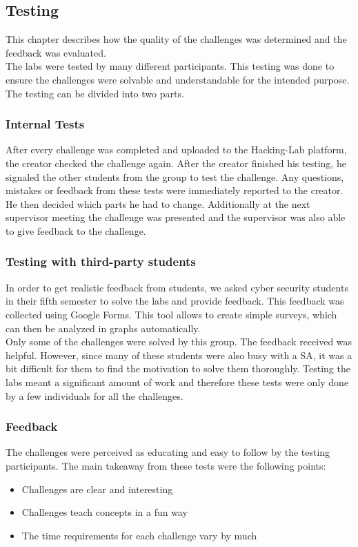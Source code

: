 \subsection{Testing}
This chapter describes how the quality of the challenges was determined and the feedback was evaluated. \\
The labs were tested by many different participants. This testing was done to ensure the challenges were solvable and understandable for the intended purpose. The testing can be divided into two parts.

\subsubsection{Internal Tests}
After every challenge was completed and uploaded to the Hacking-Lab platform, the creator checked the challenge again. After the creator finished his testing, he signaled the other students from the group to test the challenge. Any questions, mistakes or feedback from these tests were immediately reported to the creator. He then decided which parts he had to change. Additionally at the next supervisor meeting the challenge was presented and the supervisor was also able to give feedback to the challenge.

\subsubsection{Testing with third-party students}
In order to get realistic feedback from students, we asked cyber security students in their fifth semester to solve the labs and provide feedback. This feedback was collected using Google Forms. This tool allows to create simple surveys, which can then be analyzed in graphs automatically. \\
Only some of the challenges were solved by this group. The feedback received was helpful. However, since many of these students were also busy with a SA, it was a bit difficult for them to find the motivation to solve them thoroughly. Testing the labs meant a significant amount of work and therefore these tests were only done by a few individuals for all the challenges.

\subsubsection{Feedback}
The challenges were perceived as educating and easy to follow by the testing participants. The main takeaway from these tests were the following points:
\begin{itemize}
    \item Challenges are clear and interesting
    \item Challenges teach concepts in a fun way
    \item The time requirements for each challenge vary by much
  \end{itemize}

